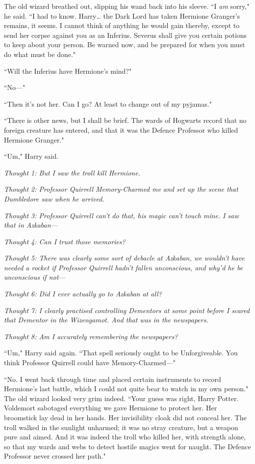 The old wizard breathed out, slipping his wand back into his sleeve. ``I \emph{am} sorry," he said. ``I had to know. Harry{\ldots} the Dark Lord has taken Hermione Granger's remains, it seems. I cannot think of anything he would gain thereby, except to send her corpse against you as an Inferius. Severus shall give you certain potions to keep about your person. Be warned now, and be prepared for when you must do what must be done."

``Will the Inferius have Hermione's mind?"

``No—"

``Then it's not her. Can I go? At least to change out of my pyjamas."

``There is other news, but I shall be brief. The wards of Hogwarts record that no foreign creature has entered, and that it was the Defence Professor who killed Hermione Granger."

``Um," Harry said.

\emph{Thought 1: But I saw the troll kill Hermione.}

\emph{Thought 2: Professor Quirrell Memory-Charmed me and set up the scene that Dumbledore saw when he arrived.}

\emph{Thought 3: Professor Quirrell can't do that, his magic can't touch mine. I saw that in Azkaban—}

\emph{Thought 4: Can I trust those memories?}

\emph{Thought 5: There was clearly some sort of debacle at Azkaban, we wouldn't have needed a rocket if Professor Quirrell hadn't fallen unconscious, and why'd he be unconscious if not—}

\emph{Thought 6: Did I ever actually go to Azkaban at all?}

\emph{Thought 7: I clearly practised controlling Dementors at some point before I scared that Dementor in the Wizengamot. And \emph{that} was in the newspapers.}

\emph{Thought 8: Am I accurately remembering the newspapers?}

``Um," Harry said again. ``That spell seriously ought to be Unforgiveable. You think Professor Quirrell could have Memory-Charmed—"

``No. I went back through time and placed certain instruments to record Hermione's last battle, which I could not quite bear to watch in my own person." The old wizard looked very grim indeed. ``Your guess was right, Harry Potter. Voldemort sabotaged everything we gave Hermione to protect her. Her broomstick lay dead in her hands. Her invisibility cloak did not conceal her. The troll walked in the sunlight unharmed; it was no stray creature, but a weapon pure and aimed. And it was indeed the troll who killed her, with strength alone, so that my wards and webs to detect hostile magics went for naught. The Defence Professor never crossed her path."

